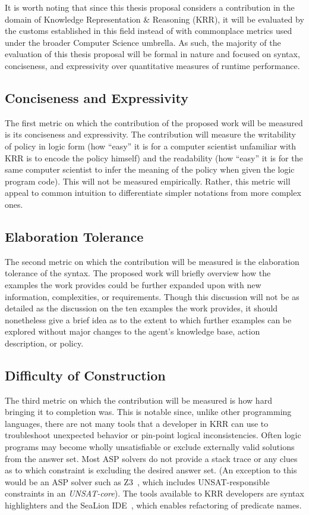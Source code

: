 It is worth noting that since this thesis proposal considers a contribution in the domain of Knowledge Representation \& Reasoning (KRR), it will be evaluated by the customs established in this field instead of with commonplace metrics used under the broader Computer Science umbrella.
As such, the majority of the evaluation of this thesis proposal will be formal in nature and focused on syntax, conciseness, and expressivity over quantitative measures of runtime performance.

\subsection{Conciseness and Expressivity}

The first metric on which the contribution of the proposed work will be measured is its conciseness and expressivity.
The contribution will measure the writability of policy in logic form (how ``easy'' it is for a computer scientist unfamiliar with KRR is to encode the policy himself) and the readability (how ``easy'' it is for the same computer scientist to infer the meaning of the policy when given the logic program code).
This will not be measured empirically.
Rather, this metric will appeal to common intuition to differentiate simpler notations from more complex ones.

\subsection{Elaboration Tolerance}

The second metric on which the contribution will be measured is the elaboration tolerance of the syntax.
The proposed work will briefly overview how the examples the work provides could be further expanded upon with new information, complexities, or requirements.
Though this discussion will not be as detailed as the discussion on the ten examples the work provides, it should nonetheless give a brief idea as to the extent to which further examples can be explored without major changes to the agent's knowledge base, action description, or policy.

\subsection{Difficulty of Construction}

The third metric on which the contribution will be measured is how hard bringing it to completion was.
This is notable since, unlike other programming languages, there are not many tools that a developer in KRR can use to troubleshoot unexpected behavior or pin-point logical inconsistencies.
Often logic programs may become wholly unsatisfiable or exclude externally valid solutions from the answer set.
Most ASP solvers do not provide a stack trace or any clues as to which constraint is excluding the desired answer set.
(An exception to this would be an ASP solver such as Z3~\citep{de_moura_z3_2008}, which includes UNSAT-responsible constraints in an \textit{UNSAT-core}).
The tools available to KRR developers are syntax highlighters and the SeaLion IDE~\citep{busoniu_sealion_2013}, which enables refactoring of predicate names.

